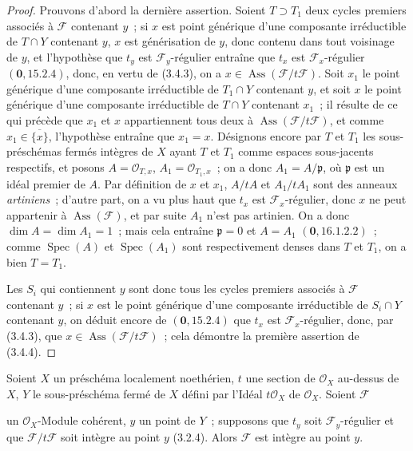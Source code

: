 \begin{proof}
Prouvons d'abord la dernière assertion. Soient $T\supset T_1$ deux cycles
premiers associés à $\mathcal F$ contenant $y$~; si $x$ est point générique
d'une composante irréductible de $T\cap Y$ contenant $y$, $x$ est
générisation de $y$, donc contenu dans tout voisinage de $y$, et l'hypothèse
que $t_y$ est $\mathcal F_y$-régulier entraîne que $t_x$ est
$\mathcal F_x$-régulier $(\mathbf{0},15.2.4)$, donc, en vertu de (3.4.3), on a
$x\in\operatorname{Ass}(\mathcal F/t\mathcal F)$. Soit $x_1$ le point
générique d'une composante irréductible de $T_1\cap Y$ contenant $y$, et soit
$x$ le point générique d'une composante irréductible de $T\cap Y$ contenant
$x_1$~; il résulte de ce qui précède que $x_1$ et $x$ appartiennent tous deux
à $\operatorname{Ass}(\mathcal F/t\mathcal F)$, et comme
$x_1\in\overline{\{x\}}$, l'hypothèse entraîne que $x_1=x$. Désignons encore
par $T$ et $T_1$ les sous-préschémas fermés intègres de $X$ ayant $T$ et
$T_1$ comme espaces sous-jacents respectifs, et posons
$A=\mathcal O_{T,x}$, $A_1=\mathcal O_{T_1,x}$~; on a donc
$A_1=A/\mathfrak p$, où $\mathfrak p$ est un idéal premier de $A$. Par
définition de $x$ et $x_1$, $A/tA$ et $A_1/tA_1$ sont des anneaux \emph{artiniens}~;
d'autre part, on a vu plus haut que $t_x$ est $\mathcal F_x$-régulier, donc
$x$ ne peut appartenir à $\operatorname{Ass}(\mathcal F)$, et par suite $A_1$
n'est pas artinien. On a donc $\dim A=\dim A_1=1$~; mais cela entraîne
$\mathfrak p=0$ et $A=A_1$ $(\mathbf{0},16.1.2.2)$~; comme
$\operatorname{Spec}(A)$ et $\operatorname{Spec}(A_1)$ sont respectivement
denses dans $T$ et $T_1$, on a bien $T=T_1$.

Les $S_i$ qui contiennent $y$ sont donc tous les cycles premiers associés à
$\mathcal F$ contenant $y$~; si $x$ est le point générique d'une composante
irréductible de $S_i\cap Y$ contenant $y$, on déduit encore de $(\mathbf{0},15.2.4)$
que $t_x$ est $\mathcal F_x$-régulier, donc, par (3.4.3), que
$x\in\operatorname{Ass}(\mathcal F/t\mathcal F)$~; cela démontre la première
assertion de (3.4.4).
\end{proof}

\begin{proposition}[3.4.5]
\label{IV.2.3.4.5-fr}
Soient $X$ un préschéma localement noethérien, $t$ une section de
$\mathcal O_X$ au-dessus de $X$, $Y$ le sous-préschéma fermé de $X$ défini par
l'Idéal $t\mathcal O_X$ de $\mathcal O_X$. Soient $\mathcal F$

un $\mathcal O_X$-Module cohérent, $y$ un point de $Y$~; supposons que $t_y$
soit $\mathcal F_y$-régulier et que $\mathcal F/t\mathcal F$ soit intègre au
point $y$ \textup{(3.2.4)}. Alors $\mathcal F$ est intègre au point $y$.
\end{proposition}

